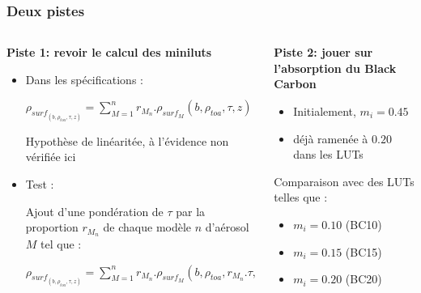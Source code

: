 \documentclass[8pt]{beamer}
\begin{document}
\begin{frame}
\frametitle{Deux pistes}
	\begin{columns}
		\begin{column}{0.6\textwidth}
			\textbf{Piste 1: revoir le calcul des miniluts}
			
			\begin{itemize}			
			\item Dans les spécifications :
			
			$\rho_{surf_{(b,\rho_{toa},\tau,z)}} = \sum\limits_{M=1}^n r_{M_{n}}.\rho_{surf_{M}}(b,\rho_{toa},\tau,z)$
			
			Hypothèse de linéaritée, à l'évidence non vérifiée ici
			
			\item Test :
			
			Ajout d'une pondération de $\tau$ par la proportion $r_{M_{n}}$ de chaque modèle $n$ d'aérosol $M$ tel que :
			
			$\rho_{surf_{(b,\rho_{toa},\tau,z)}} = \sum\limits_{M=1}^n r_{M_{n}}.\rho_{surf_{M}}(b,\rho_{toa},r_{M_{n}}.\tau,z)$
			\end{itemize}
		\end{column}
		\begin{column}{0.4\textwidth}
			\textbf{Piste 2: jouer sur l'absorption du Black Carbon}
			\begin{itemize}
				\item Initialement, $m_{i}=0.45$
				\item déjà ramenée à $0.20$ dans les LUTs
			\end{itemize}

			Comparaison avec des LUTs telles que :
			\begin{itemize}
				\item $m_{i}=0.10$ (BC10)
				\item $m_{i}=0.15$ (BC15)
				\item $m_{i}=0.20$ (BC20)
			\end{itemize}
				
		\end{column}
	\end{columns}
\end{frame}
\end{document}

